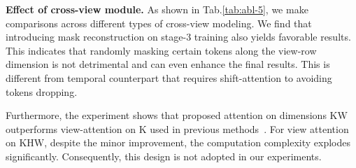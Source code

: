 \noindent \textbf{Effect of cross-view module.}
As shown in Tab.\ref{tab:abl-5}, we make comparisons across different types of cross-view modeling. We find that introducing mask reconstruction on stage-3 training also yields favorable results. 
This indicates that randomly masking certain tokens along the view-row dimension is not detrimental and can even enhance the final results. This is different from temporal counterpart that requires shift-attention to avoiding tokens dropping. 

Furthermore, the experiment shows that proposed attention on dimensions $\mathrm{KW}$ outperforms view-attention on $\mathrm{K}$ used in previous methods~\cite{drive-wm,drivedreamer}. For view attention on $\mathrm{KHW}$, despite the minor improvement, the computation complexity explodes significantly. Consequently, this design is not adopted in our experiments.

